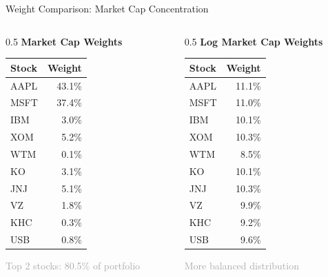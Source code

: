 \documentclass[12pt, aspectratio=43]{beamer}
\begin{document}
	\begin{frame}{Weight Comparison: Market Cap Concentration}
		\vspace{-2mm}
		\begin{columns}[T]
			\begin{column}{0.5\textwidth}
				\centering
				\textbf{Market Cap Weights}
				\begin{table}
					\footnotesize
					\begin{tabular}{lr}
						\toprule
						Stock & Weight \\
						\midrule
						AAPL & 43.1\% \\
						MSFT & 37.4\% \\
						IBM & 3.0\% \\
						XOM & 5.2\% \\
						WTM & 0.1\% \\
						KO & 3.1\% \\
						JNJ & 5.1\% \\
						VZ & 1.8\% \\
						KHC & 0.3\% \\
						USB & 0.8\% \\
						\bottomrule
					\end{tabular}
				\end{table}
				\textcolor{darkgray}{Top 2 stocks: 80.5\% of portfolio}
			\end{column}
			\begin{column}{0.5\textwidth}
				\centering
				\textbf{Log Market Cap Weights}
				\begin{table}
					\footnotesize
					\begin{tabular}{lr}
						\toprule
						Stock & Weight \\
						\midrule
						AAPL & 11.1\% \\
						MSFT & 11.0\% \\
						IBM & 10.1\% \\
						XOM & 10.3\% \\
						WTM & 8.5\% \\
						KO & 10.1\% \\
						JNJ & 10.3\% \\
						VZ & 9.9\% \\
						KHC & 9.2\% \\
						USB & 9.6\% \\
						\bottomrule
					\end{tabular}
				\end{table}
				\textcolor{darkgray}{More balanced distribution}
			\end{column}
		\end{columns}
	\end{frame}
	
\end{document}
